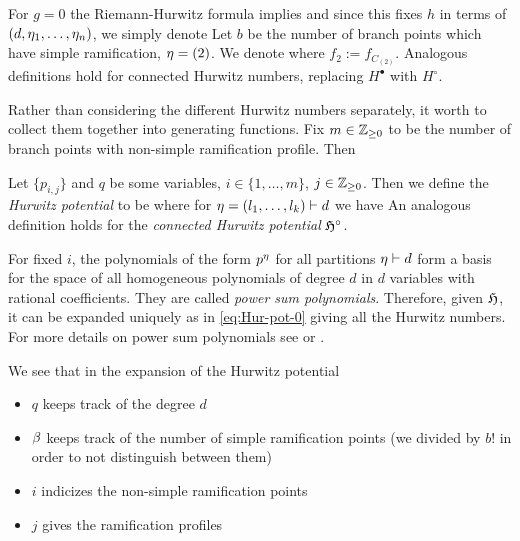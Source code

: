 \documentclass[../main/main.tex]{subfiles}
\begin{document}
For $g=0$ the Riemann-Hurwitz formula implies
and since this fixes $h$ in terms of $(d,\eta_1,\ldots,\eta_n)$, we simply denote
Let $b$ be the number of branch points which have simple ramification, \ie $\eta=(2)$. We denote
where $f_2:=f_{C_{(2)}}$. Analogous definitions hold for connected Hurwitz numbers, replacing $H^\bullet$ with $H^\circ$. 

Rather than considering the different Hurwitz numbers separately, it worth to collect them together into generating functions. Fix $m\in\mathbb Z_{\geq0}$ to be the number of branch points with non-simple ramification profile. Then

\begin{definition}
	Let $\{p_{i,j}\}$ and $q$ be some variables, $i\in\{1,\ldots,m\}$, $j\in\mathbb Z_{\geq0}$. Then we define the \emph{Hurwitz potential} to be
	where for $\eta=(l_1,\ldots,l_k)\vdash d$ we have
	An analogous definition holds for the \emph{connected Hurwitz potential} $\mathfrak H^\circ$. 
\end{definition}

For fixed $i$, the polynomials of the form $p^\eta$ for all partitions $\eta\vdash d$ form a basis for the space of all homogeneous polynomials of degree $d$ in $d$ variables with rational coefficients. They are called \emph{power sum polynomials}. Therefore, given $\mathfrak H$, it can be expanded uniquely as in \eqref{eq:Hur-pot-0} giving all the Hurwitz numbers. For more details on power sum polynomials see \cite[§A]{FH} or \cite[Part I]{M}. 

We see that in the expansion of the Hurwitz potential
\begin{itemize}
	\item $q$ keeps track of the degree $d$
	\item $\beta$ keeps track of the number of simple ramification points (we divided by $b!$ in order to not distinguish between them)
	\item $i$ indicizes the non-simple ramification points
	\item $j$ gives the ramification profiles
\end{itemize}
\end{document}
